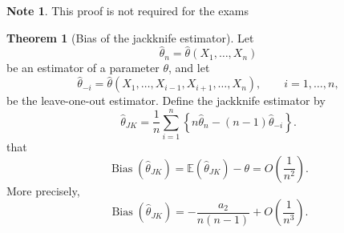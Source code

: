 \documentclass[11pt]{article}
\theoremstyle{definition}
\newtheorem{note}{Note}[section]
\newtheorem{theo}{Theorem}[section]
\begin{document}
\begin{note}
    This proof is not required for the exams
\end{note}
\begin{theo}[Bias of the jackknife estimator]
Let
\[
\hat\theta_n=\hat\theta(X_1,\dots,X_n)
\]
be an estimator of a parameter \(\theta\), and let
\[
\hat\theta_{-i}
=
\hat\theta(X_1,\dots,X_{i-1},X_{i+1},\dots,X_n),
\qquad i=1,\dots,n,
\]
be the leave-one-out estimator. Define the jackknife estimator by
\[
\hat\theta_{JK}
=
\frac{1}{n}\sum_{i=1}^n \left\{n\hat\theta_n-(n-1)\hat\theta_{-i}\right\}.
\]
that
\[
\operatorname{Bias}(\hat\theta_{JK})
=
\mathbb E(\hat\theta_{JK})-\theta
=
O\!\left(\frac{1}{n^2}\right).
\]
More precisely,
\[
\operatorname{Bias}(\hat\theta_{JK})
=
-\frac{a_2}{n(n-1)}+O\!\left(\frac{1}{n^3}\right).
\]
\end{theo}
\end{document}
